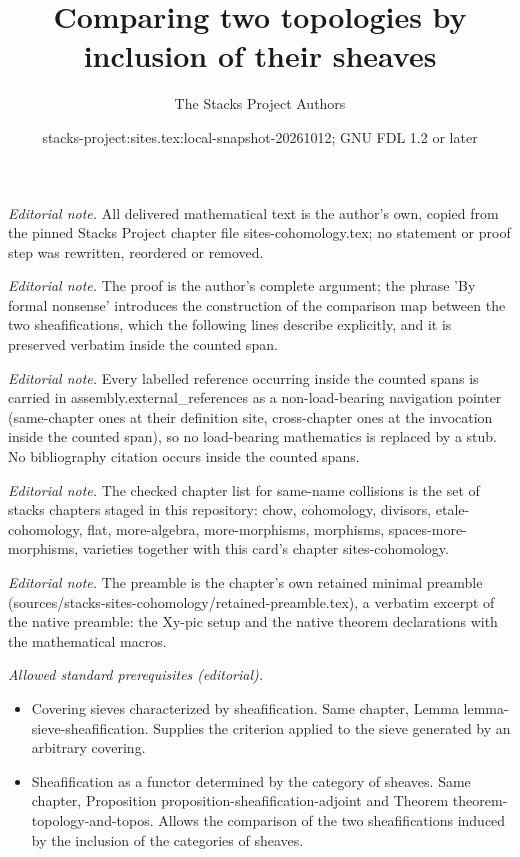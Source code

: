 \documentclass[10pt,a4paper]{amsart}
\title{Comparing two topologies by inclusion of their sheaves}
\author{The Stacks Project Authors}
\date{stacks-project:sites.tex:local-snapshot-20261012; GNU FDL 1.2 or later}
\theoremstyle{plain}
\theoremstyle{definition}
\theoremstyle{remark}
\numberwithin{equation}{subsection}
\begin{document}
\maketitle
\noindent\textit{Editorial note.} All delivered mathematical text is the author's own, copied from the pinned Stacks Project chapter file sites-cohomology.tex; no statement or proof step was rewritten, reordered or removed.\par\medskip
\noindent\textit{Editorial note.} The proof is the author's complete argument; the phrase 'By formal nonsense' introduces the construction of the comparison map between the two sheafifications, which the following lines describe explicitly, and it is preserved verbatim inside the counted span.\par\medskip
\noindent\textit{Editorial note.} Every labelled reference occurring inside the counted spans is carried in assembly.external\_references as a non-load-bearing navigation pointer (same-chapter ones at their definition site, cross-chapter ones at the invocation inside the counted span), so no load-bearing mathematics is replaced by a stub. No bibliography citation occurs inside the counted spans.\par\medskip
\noindent\textit{Editorial note.} The checked chapter list for same-name collisions is the set of stacks chapters staged in this repository: chow, cohomology, divisors, etale-cohomology, flat, more-algebra, more-morphisms, morphisms, spaces-more-morphisms, varieties together with this card's chapter sites-cohomology.\par\medskip
\noindent\textit{Editorial note.} The preamble is the chapter's own retained minimal preamble (sources/stacks-sites-cohomology/retained-preamble.tex), a verbatim excerpt of the native preamble: the Xy-pic setup and the native theorem declarations with the mathematical macros.\par\medskip
\noindent\textit{Allowed standard prerequisites (editorial).}\begin{itemize}
\item Covering sieves characterized by sheafification. Same chapter, Lemma lemma-sieve-sheafification. Supplies the criterion applied to the sieve generated by an arbitrary covering.
\item Sheafification as a functor determined by the category of sheaves. Same chapter, Proposition proposition-sheafification-adjoint and Theorem theorem-topology-and-topos. Allows the comparison of the two sheafifications induced by the inclusion of the categories of sheaves.
\end{itemize}\medskip
\end{document}
